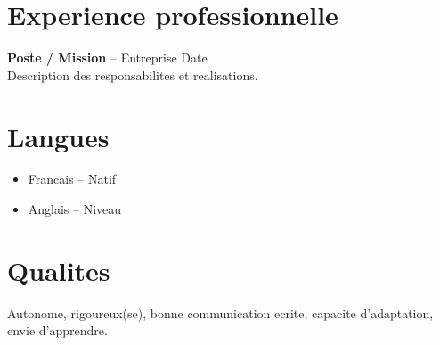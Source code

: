 \documentclass[a4paper,11pt]{article}
\begin{document}
\section{Experience professionnelle}
\textbf{Poste / Mission} -- Entreprise \hfill Date\\
Description des responsabilites et realisations.

\section{Langues}
\begin{itemize}[nosep]
    \item Francais -- Natif
    \item Anglais -- Niveau
\end{itemize}

\section{Qualites}
Autonome, rigoureux(se), bonne communication ecrite, capacite d'adaptation, envie d'apprendre.
\end{document}
